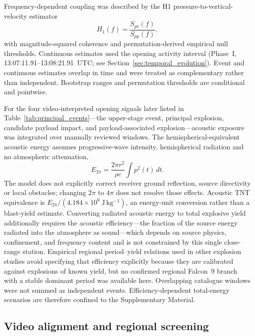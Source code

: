 \documentclass[]{seismica}
\begin{document}
Frequency-dependent coupling was described by the H1 pressure-to-vertical-velocity estimator
\begin{equation}
 H_1(f)=\frac{S_{pv}(f)}{S_{pp}(f)},
 \label{eq:h1_transfer}
\end{equation}
with magnitude-squared coherence and permutation-derived empirical null
thresholds. Continuous estimates used the opening activity interval
(Phase~I, 13:07:11.91--13:08:21.91~UTC; see Section~\ref{sec:temporal_evolution}).
Event and continuous estimates overlap in time and were treated as
complementary rather than independent. Bootstrap ranges and permutation
thresholds are conditional and pointwise.

For the four video-interpreted opening signals later listed in
Table~\ref{tab:principal_events}---the upper-stage event, principal explosion,
candidate payload impact, and payload-associated explosion---acoustic exposure
was integrated over manually reviewed windows. The hemispherical-equivalent
acoustic energy assumes progressive-wave intensity, hemispherical radiation
and no atmospheric attenuation,
\begin{equation}
 E_{2\pi}=\frac{2\pi r^2}{\rho c}\int p^2(t)\,dt.
 \label{eq:acoustic_energy}
\end{equation}
The model does not explicitly correct receiver ground reflection, source
directivity or local obstacles; changing $2\pi$ to $4\pi$ does not resolve
those effects. Acoustic TNT equivalence is $E_{2\pi}/(4.184\times10^6~\mathrm{J\,kg^{-1}})$,
an energy-unit conversion rather than a blast-yield estimate. Converting
radiated acoustic energy to total explosive yield additionally requires the
acoustic efficiency---the fraction of the source energy radiated into the
atmosphere as sound---which depends on source physics, confinement, and
frequency content and is not constrained by this single close-range station.
Empirical regional period--yield relations used in other explosion studies
avoid specifying that efficiency explicitly because they are calibrated
against explosions of known yield, but no confirmed regional Falcon~9 branch
with a stable dominant period was available here. Overlapping catalogue
windows were not summed as independent events. Efficiency-dependent
total-energy scenarios are therefore confined to the Supplementary Material.

\subsection{Video alignment and regional screening}
\end{document}
